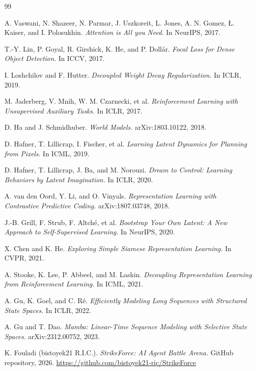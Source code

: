 \documentclass[11pt]{article}
\begin{document}
\begin{thebibliography}{99}

A. Vaswani, N. Shazeer, N. Parmar, J. Uszkoreit, L. Jones, A. N. Gomez, \L. Kaiser, and I. Polosukhin.
\textit{Attention is All you Need.}
In NeurIPS, 2017.

T.-Y. Lin, P. Goyal, R. Girshick, K. He, and P. Doll\'ar.
\textit{Focal Loss for Dense Object Detection.}
In ICCV, 2017.

I. Loshchilov and F. Hutter.
\textit{Decoupled Weight Decay Regularization.}
In ICLR, 2019.

M. Jaderberg, V. Mnih, W. M. Czarnecki, et al.
\textit{Reinforcement Learning with Unsupervised Auxiliary Tasks.}
In ICLR, 2017.

D. Ha and J. Schmidhuber.
\textit{World Models.}
arXiv:1803.10122, 2018.

D. Hafner, T. Lillicrap, I. Fischer, et al.
\textit{Learning Latent Dynamics for Planning from Pixels.}
In ICML, 2019.

D. Hafner, T. Lillicrap, J. Ba, and M. Norouzi.
\textit{Dream to Control: Learning Behaviors by Latent Imagination.}
In ICLR, 2020.

A. van den Oord, Y. Li, and O. Vinyals.
\textit{Representation Learning with Contrastive Predictive Coding.}
arXiv:1807.03748, 2018.

J.-B. Grill, F. Strub, F. Altch\'e, et al.
\textit{Bootstrap Your Own Latent: A New Approach to Self-Supervised Learning.}
In NeurIPS, 2020.

X. Chen and K. He.
\textit{Exploring Simple Siamese Representation Learning.}
In CVPR, 2021.

A. Stooke, K. Lee, P. Abbeel, and M. Laskin.
\textit{Decoupling Representation Learning from Reinforcement Learning.}
In ICML, 2021.

A. Gu, K. Goel, and C. R\'e.
\textit{Efficiently Modeling Long Sequences with Structured State Spaces.}
In ICLR, 2022.

A. Gu and T. Dao.
\textit{Mamba: Linear-Time Sequence Modeling with Selective State Spaces.}
arXiv:2312.00752, 2023.

K. Fouladi (bistoyek21 R.I.C.).
\textit{StrikeForce: AI Agent Battle Arena.}
GitHub repository, 2026. \url{https://github.com/bistoyek21-ric/StrikeForce}


\end{thebibliography}
\end{document}
